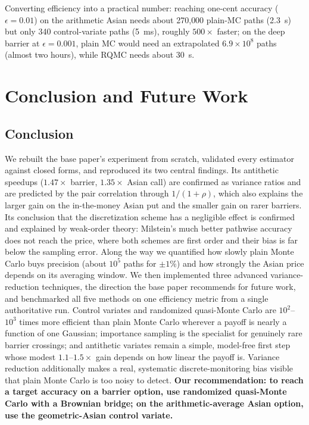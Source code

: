 \documentclass[sigconf]{acmart}
\begin{document}
Converting efficiency into a practical number: reaching one-cent accuracy
($\epsilon=0.01$) on the arithmetic Asian needs about 270{,}000 plain-MC
paths (2.3~s) but only 340 control-variate paths (5~ms), roughly
$500\times$ faster; on the deep barrier at $\epsilon=0.001$, plain MC would
need an extrapolated $6.9\times 10^8$ paths (almost two hours), while RQMC
needs about 30~s.

\section{Conclusion and Future Work}

\subsection{Conclusion}
We rebuilt the base paper's experiment from scratch, validated every
estimator against closed forms, and reproduced its two central findings.
Its antithetic speedups ($1.47\times$ barrier, $1.35\times$ Asian call)
are confirmed as variance ratios and are predicted by the pair correlation through $1/(1+\rho)$, which also explains the larger gain on
the in-the-money Asian put and the smaller gain on rarer barriers. Its
conclusion that the discretization scheme has a negligible effect is
confirmed and explained by weak-order theory: Milstein's much better
pathwise accuracy does not reach the price, where both schemes are first
order and their bias is far below the sampling error. Along the way we
quantified how slowly plain Monte Carlo buys precision (about $10^5$ paths
for $\pm1\%$) and how strongly the Asian price depends on its averaging
window. We then implemented three advanced variance-reduction techniques,
the direction the base paper recommends for future work, and benchmarked
all five methods on one efficiency metric from a single authoritative run. Control variates
and randomized quasi-Monte Carlo are $10^2$--$10^3$ times more efficient than
plain Monte Carlo wherever a payoff is nearly a function of one Gaussian;
importance sampling is the specialist for genuinely rare barrier crossings;
and antithetic variates remain a simple, model-free first step whose
modest $1.1$--$1.5\times$ gain depends on how linear the payoff is. Variance reduction additionally makes a real, systematic
discrete-monitoring bias visible that plain Monte Carlo is too noisy to
detect. \textbf{Our recommendation: to reach a target accuracy on a barrier
option, use randomized quasi-Monte Carlo with a Brownian bridge; on the
arithmetic-average Asian option, use the geometric-Asian control variate.}
\end{document}
